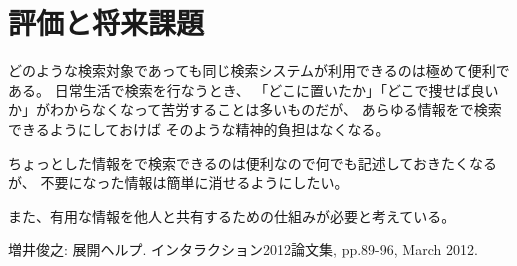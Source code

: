 \documentclass{ipsjprosym}
\begin{document}

\section{評価と将来課題}

どのような検索対象であっても同じ検索システムが利用できるのは極めて便利である。
日常生活で検索を行なうとき、
「どこに置いたか」「どこで捜せば良いか」がわからなくなって苦労することは多いものだが、
あらゆる情報を{\ds}で検索できるようにしておけば
そのような精神的負担はなくなる。

ちょっとした情報を{\ds}で検索できるのは便利なので何でも記述しておきたくなるが、
不要になった情報は簡単に消せるようにしたい。

また、有用な情報を他人と共有するための仕組みが必要と考えている。


\begin{thebibliography}{9}
 増井俊之: 展開ヘルプ. インタラクション2012論文集, pp.89-96, March 2012.
\end{thebibliography}
\end{document}
